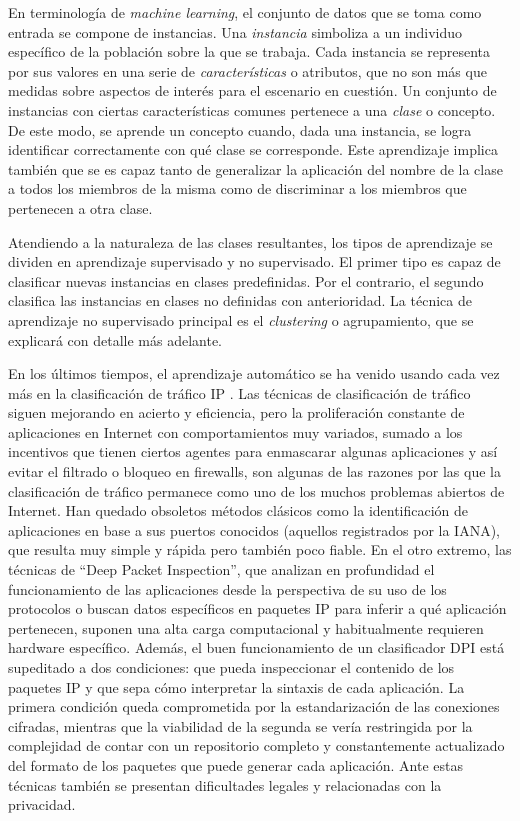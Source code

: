 En terminología de \emph{machine learning}, el conjunto de datos que se toma como entrada se compone de instancias.
Una \emph{instancia} simboliza a un individuo específico de la población sobre la que se trabaja.
Cada instancia se representa por sus valores en una serie de \emph{características} o atributos, que no son más que medidas sobre aspectos de interés para el escenario en cuestión.
Un conjunto de instancias con ciertas características comunes pertenece a una \emph{clase} o concepto.
De este modo, se aprende un concepto cuando, dada una instancia, se logra identificar correctamente con qué clase se corresponde.
Este aprendizaje implica también que se es capaz tanto de generalizar la aplicación del nombre de la clase a todos los miembros de la misma como de discriminar a los miembros que pertenecen a otra clase.

Atendiendo a la naturaleza de las clases resultantes, los tipos de aprendizaje se dividen en aprendizaje supervisado y no supervisado.
El primer tipo es capaz de clasificar nuevas instancias en clases predefinidas.
Por el contrario, el segundo clasifica las instancias en clases no definidas con anterioridad.
La técnica de aprendizaje no supervisado principal es el \emph{clustering} o agrupamiento, que se explicará con detalle más adelante.

En los últimos tiempos, el aprendizaje automático se ha venido usando cada vez más en la clasificación de tráfico IP \cite{Dainotti_2012}.
Las técnicas de clasificación de tráfico siguen mejorando en acierto y eficiencia, pero
la proliferación constante de aplicaciones en Internet con comportamientos muy variados, sumado a
los incentivos que tienen ciertos agentes para enmascarar algunas aplicaciones y así evitar el filtrado o bloqueo en firewalls,
son algunas de las razones por las que la clasificación de tráfico permanece como uno de los muchos problemas abiertos de Internet.
Han quedado obsoletos métodos clásicos como la identificación de aplicaciones en base a sus puertos conocidos (aquellos registrados por la IANA), que resulta muy simple y rápida pero también poco fiable.
En el otro extremo, las técnicas de ``Deep Packet Inspection'', que analizan en profundidad el funcionamiento de las aplicaciones desde la perspectiva de su uso de los protocolos o
buscan datos específicos en paquetes IP para inferir a qué aplicación pertenecen, suponen una alta carga computacional y habitualmente requieren hardware específico.
Además, el buen funcionamiento de un clasificador DPI está supeditado a dos condiciones: que pueda inspeccionar el contenido de los paquetes IP y que sepa cómo interpretar la sintaxis de cada aplicación.
La primera condición queda comprometida por la estandarización de las conexiones cifradas,
mientras que la viabilidad de la segunda se vería restringida por la complejidad de contar con un repositorio completo y constantemente actualizado del formato de los paquetes que puede generar cada aplicación.
Ante estas técnicas también se presentan dificultades legales y relacionadas con la privacidad.

